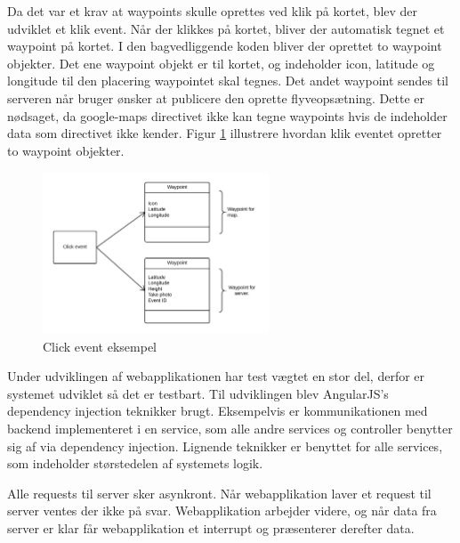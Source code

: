 Da det var et krav at waypoints skulle oprettes ved klik på kortet, blev der udviklet et klik event. 
Når der klikkes på kortet, bliver der automatisk tegnet et waypoint på kortet. 
I den bagvedliggende koden bliver der oprettet to waypoint objekter. 
Det ene waypoint objekt er til kortet, og indeholder icon, latitude og longitude til den placering waypointet skal tegnes.  Det andet waypoint sendes til serveren når bruger ønsker at publicere den oprette flyveopsætning. 
Dette er nødsaget, da google-maps directivet ikke kan tegne waypoints hvis de indeholder data som directivet ikke kender. Figur \ref{fig:click_event} illustrere hvordan klik eventet opretter to waypoint objekter.

\vspace{-5pt}
\begin{figure}[H]
	\centering
	\includegraphics[width=0.6\textwidth]{Billeder/click_event.png}
	\vspace{-5pt}
	\caption{Click event eksempel}
	\label{fig:click_event}
\end{figure}


Under udviklingen af webapplikationen har test vægtet en stor del, derfor er systemet udviklet så det er testbart. Til udviklingen blev AngularJS's dependency injection teknikker brugt. Eksempelvis er kommunikationen med backend implementeret i en service, som alle andre services og controller benytter sig af via dependency injection. Lignende teknikker er benyttet for alle services, som indeholder størstedelen af systemets logik.  

Alle requests til server sker asynkront. Når webapplikation laver et request til server ventes der ikke på svar. Webapplikation arbejder videre, og når data fra server er klar får webapplikation et interrupt og præsenterer derefter data.
